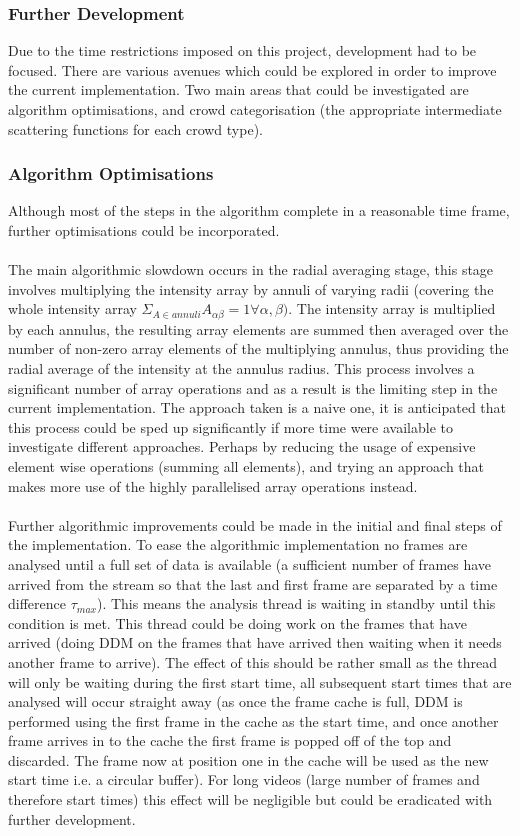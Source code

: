 \documentclass[10pt]{article}
\begin{document}
\subsubsection{Further Development}
Due to the time restrictions imposed on this project, development had to be focused. There are various avenues which could be explored in order to improve the current implementation. Two main areas that could be investigated are algorithm optimisations, and crowd categorisation (the appropriate intermediate scattering functions for each crowd type).

\subsubsection{Algorithm Optimisations}
Although most of the steps in the algorithm complete in a reasonable time frame, further optimisations could be incorporated.
\\\\
The main algorithmic slowdown occurs in the radial averaging stage, this stage involves multiplying the intensity array by annuli of varying radii (covering the whole intensity array $\Sigma_{A \in annuli} A_{\alpha \beta} = 1 \forall \alpha, \beta)$. The intensity array is multiplied by each annulus, the resulting array elements are summed then averaged over the number of non-zero array elements of the multiplying annulus, thus providing the radial average of the intensity at the annulus radius. This process involves a significant number of array operations and as a result is the limiting step in the current implementation. The approach taken is a naive one, it is anticipated that this process could be sped up significantly if more time were available to investigate different approaches. Perhaps by reducing the usage of expensive element wise operations (summing all elements), and trying an approach that makes more use of the highly parallelised array operations instead.
\\\\
Further algorithmic improvements could be made in the initial and final steps of the implementation. To ease the algorithmic implementation no frames are analysed until a full set of data is available (a sufficient number of frames have arrived from the stream so that the last and first frame are separated by a time difference $\tau_{max}$). This means the analysis thread is waiting in standby until this condition is met. This thread could be doing work on the frames that have arrived (doing DDM on the frames that have arrived then waiting when it needs another frame to arrive). The effect of this should be rather small as the thread will only be waiting during the first start time, all subsequent start times that are analysed will occur straight away (as once the frame cache is full, DDM is performed using the first frame in the cache as the start time, and once another frame arrives in to the cache the first frame is popped off of the top and discarded. The frame now at position one in the cache will be used as the new start time i.e. a circular buffer). For long videos (large number of frames and therefore start times) this effect will be negligible but could be eradicated with further development. 
\end{document}
